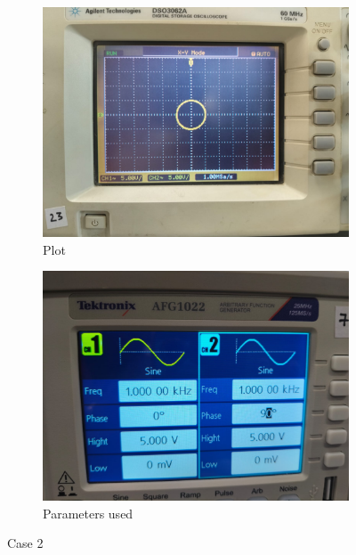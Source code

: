 \documentclass[a4paper,12pt]{article}
\begin{document}
\begin{figure}[htbp]
    \centering
    \begin{subfigure}[b]{0.45\textwidth}
        \centering
        \includegraphics[width=\linewidth]{figs/2/plot2.jpeg}
        \caption{Plot}
        \label{fig:image1}
    \end{subfigure}
    \hfill
    \begin{subfigure}[b]{0.45\textwidth}
        \centering
        \includegraphics[width=\linewidth]{figs/2/para2.jpeg}
        \caption{Parameters used}
        \label{fig:image2}
    \end{subfigure}
    \caption{Case 2}
    \label{fig:sidebyside}
\end{figure}
\end{document}
